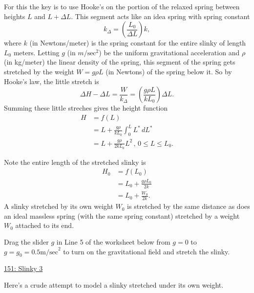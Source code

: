 \documentclass{ximera}
\begin{document}
For this the key is to use Hooke's on the portion of the relaxed spring between heights $L$ and $L+\Delta L$. This segment acts like an idea spring with spring constant
\[
        k_\Delta  =  \left( \frac{L_0}{\Delta L} \right) k,   
\]
where $k$ (in Newtons/meter) is the spring constant for the entire slinky of length $L_0$ meters. Letting $g$ (in $m/\text{sec}^2$) be the uniform gravitational acceleration and $\rho$ (in kg/meter) the linear density of the spring, this segment of the spring gets stretched by the weight $W =g \rho L$ (in Newtons) of the spring below it. So by Hooke's law, the little stretch is
\[
     \Delta H - \Delta L =  \frac{W}{k_\Delta} = \left( \frac{g\rho L}{k L_0} \right) \Delta L .
\]
Summing these little streches gives the height function
\begin{align*}
    H &= f(L)   \\
        &= L +  \frac{g\rho}{k L_0} \int_0^L L^* \, dL^* \\
         & = L + \frac{g\rho}{2kL_0}L^2 \, , \, 0\leq L \leq L_0 .
\end{align*}

Note the entire length of the stretched slinky is
\begin{align*}
   H_0 &= f(L_0)  \\
          &= L_0 + \frac{g\rho L_0}{2k} \\
          &= L_0 +  \frac{W_0}{2k}  .
\end{align*}
A slinky stretched by its own weight $W_0$ is stretched by the same distance as does an ideal massless spring (with the same spring constant) stretched by a weight $W_0$ attached to its end.



Drag the slider $g$ in Line 5 of the worksheet below from $g=0$ to $g=g_0 = 0.5 \text{m/sec}^2$ to turn on the gravitational field and stretch the slinky. 

\begin{onlineOnly}
    \begin{center}
\end{center}
\end{onlineOnly}

\href{https://www.desmos.com/calculator/vjjibjkdrz}{151: Slinky 3}

Here's a crude attempt to model a slinky stretched under its own weight.

\begin{onlineOnly}
    \begin{center}
\end{center}
\end{onlineOnly}
\end{document}
